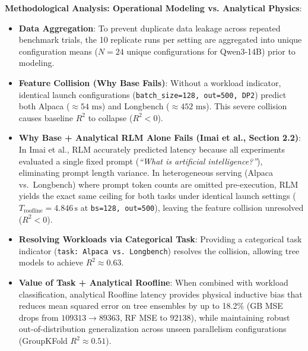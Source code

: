 \documentclass[10pt,a4paper]{article}
\begin{document}
\vspace{0.1em}
\noindent \textbf{Methodological Analysis: Operational Modeling vs. Analytical Physics}:
\begin{itemize}
    \setlength\itemsep{0.03em}
    \item \textbf{Data Aggregation}: To prevent duplicate data leakage across repeated benchmark trials, the 10 replicate runs per setting are aggregated into unique configuration means ($N=24$ unique configurations for Qwen3-14B) prior to modeling.
    \item \textbf{Feature Collision (Why Base Fails)}: Without a workload indicator, identical launch configurations (\texttt{batch\_size=128, out=500, DP2}) predict both Alpaca ($\approx 54\text{ ms}$) and Longbench ($\approx 452\text{ ms}$). This severe collision causes baseline $R^2$ to collapse ($R^2 < 0$).
    \item \textbf{Why Base + Analytical RLM Alone Fails (Imai et al., Section 2.2)}: In Imai et al., RLM accurately predicted latency because all experiments evaluated a single fixed prompt (\textit{``What is artificial intelligence?''}), eliminating prompt length variance. In heterogeneous serving (Alpaca vs.~Longbench) where prompt token counts are omitted pre-execution, RLM yields the exact same ceiling for both tasks under identical launch settings ($T_{\text{roofline}} = 4.846\,\text{s}$ at \texttt{bs=128, out=500}), leaving the feature collision unresolved ($R^2 < 0$).
    \item \textbf{Resolving Workloads via Categorical Task}: Providing a categorical task indicator (\texttt{task: Alpaca vs. Longbench}) resolves the collision, allowing tree models to achieve $R^2 \approx 0.63$.
    \item \textbf{Value of Task + Analytical Roofline}: When combined with workload classification, analytical Roofline latency provides physical inductive bias that reduces mean squared error on tree ensembles by up to 18.2\% (GB MSE drops from $109313 \to 89363$, RF MSE to $92138$), while maintaining robust out-of-distribution generalization across unseen parallelism configurations (GroupKFold $R^2 \approx 0.51$).
\end{itemize}
\end{document}
